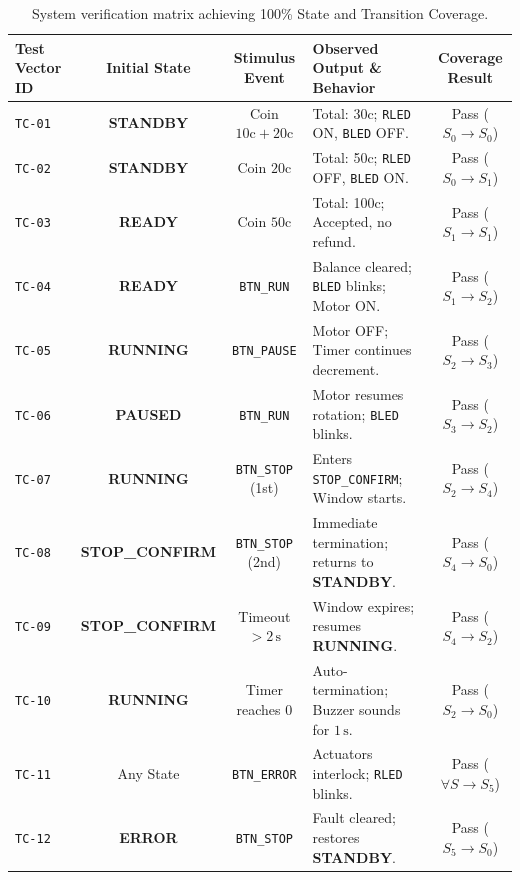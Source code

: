 \documentclass[12pt]{article}
\begin{document}
\begin{table}[H]
\centering
\small
\renewcommand{\arraystretch}{1.25}
\begin{tabularx}{\textwidth}{l c c X c}
\toprule
\textbf{Test Vector ID} & \textbf{Initial State} & \textbf{Stimulus Event} & \textbf{Observed Output \& Behavior} & \textbf{Coverage Result} \\
\midrule
\texttt{TC-01} & \textbf{STANDBY} & Coin $10\text{c} + 20\text{c}$ & Total: 30c; \texttt{RLED} ON, \texttt{BLED} OFF. & Pass ($S_0 \to S_0$) \\
\texttt{TC-02} & \textbf{STANDBY} & Coin $20\text{c}$ & Total: 50c; \texttt{RLED} OFF, \texttt{BLED} ON. & Pass ($S_0 \to S_1$) \\
\texttt{TC-03} & \textbf{READY}   & Coin $50\text{c}$ & Total: 100c; Accepted, no refund. & Pass ($S_1 \to S_1$) \\
\texttt{TC-04} & \textbf{READY}   & \texttt{BTN\_RUN} & Balance cleared; \texttt{BLED} blinks; Motor ON. & Pass ($S_1 \to S_2$) \\
\texttt{TC-05} & \textbf{RUNNING} & \texttt{BTN\_PAUSE} & Motor OFF; Timer continues decrement. & Pass ($S_2 \to S_3$) \\
\texttt{TC-06} & \textbf{PAUSED}  & \texttt{BTN\_RUN} & Motor resumes rotation; \texttt{BLED} blinks. & Pass ($S_3 \to S_2$) \\
\texttt{TC-07} & \textbf{RUNNING} & \texttt{BTN\_STOP} (1st) & Enters \texttt{STOP\_CONFIRM}; Window starts. & Pass ($S_2 \to S_4$) \\
\texttt{TC-08} & \textbf{STOP\_CONFIRM} & \texttt{BTN\_STOP} (2nd) & Immediate termination; returns to \textbf{STANDBY}. & Pass ($S_4 \to S_0$) \\
\texttt{TC-09} & \textbf{STOP\_CONFIRM} & Timeout $>2\,\text{s}$ & Window expires; resumes \textbf{RUNNING}. & Pass ($S_4 \to S_2$) \\
\texttt{TC-10} & \textbf{RUNNING} & Timer reaches 0 & Auto-termination; Buzzer sounds for $1\,\text{s}$. & Pass ($S_2 \to S_0$) \\
\texttt{TC-11} & Any State        & \texttt{BTN\_ERROR} & Actuators interlock; \texttt{RLED} blinks. & Pass ($\forall S \to S_5$) \\
\texttt{TC-12} & \textbf{ERROR}   & \texttt{BTN\_STOP} & Fault cleared; restores \textbf{STANDBY}. & Pass ($S_5 \to S_0$) \\
\bottomrule
\end{tabularx}
\caption{System verification matrix achieving 100\% State and Transition Coverage.}
\label{tab:coverage}
\end{table}
\end{document}
